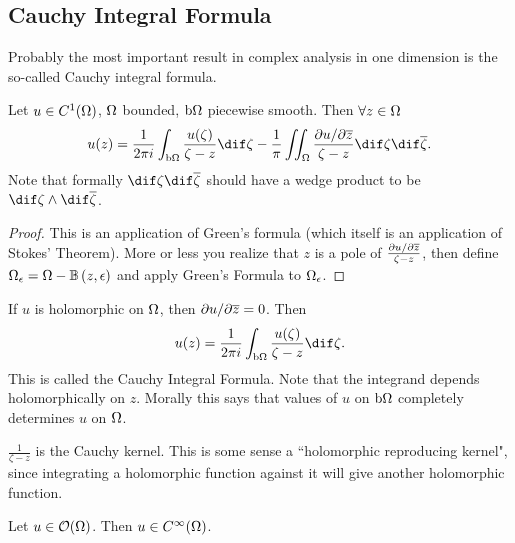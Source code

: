 \subsection{Cauchy Integral Formula}
Probably the most important result in complex analysis in one dimension is the so-called Cauchy integral formula.

\begin{theorem}
    Let $u \in C^1(\Omega)$, $\Omega $ bounded, $\operatorname{b}\! \Omega$ piecewise smooth. Then $\forall z \in \Omega$
    \begin{align*}
        u(z) = \frac{1}{2 \pi i} \int_{\bdy \om} \frac{u (\zeta) }{\zeta - z } \dif \zeta - \frac{1}{\pi} \iint_{\om} \frac{\partial u / \partial \ov{z}}{\zeta - z } \dif \zeta \dif \ov{\zeta}.
    \end{align*}
    Note that formally $\dif \zeta \dif \ov{\zeta}$ should have a wedge product to be $\dif \zeta \wedge \dif \ov{\zeta}$.
\end{theorem}

\begin{proof}
    This is an application of Green's formula (which itself is an application of Stokes' Theorem). More or less you realize that $z $ is a pole of $\frac{\partial u / \partial \overline{z}}{\zeta - z }$, then define $\om_\epsilon = \om - \ball{z}{\epsilon}$ and apply Green's Formula to $\Omega_\epsilon$.
\end{proof}

\begin{remark}
    If $u$ is holomorphic on $\Omega$, then $\partial u / \partial \overline{z} = 0$. Then
    \begin{align*}
        u(z) = \frac{1}{2 \pi i} \int_{\bdy \om} \frac{u (\zeta) }{\zeta - z } \dif \zeta.
    \end{align*}
    This is called the Cauchy Integral Formula. Note that the integrand depends holomorphically on $z$. Morally this says that values of $u$ on $\operatorname{b}\! \Omega$ completely determines $u $ on $\Omega$.
\end{remark}

\begin{remark}
    $\frac{1}{\zeta - z}$ is the Cauchy kernel. This is some sense a ``holomorphic reproducing kernel", since integrating a holomorphic function against it will give another holomorphic function.
\end{remark}

\begin{corollary}
    Let $u \in \mathcal{O}(\Omega)$. Then $u \in C^\infty(\Omega)$.
\end{corollary}

